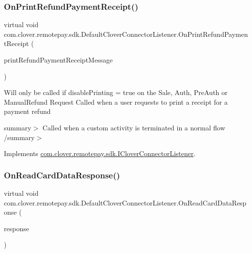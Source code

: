 \subsubsection{\texorpdfstring{On\+Print\+Refund\+Payment\+Receipt()}{OnPrintRefundPaymentReceipt()}}
{\footnotesize\ttfamily virtual void com.\+clover.\+remotepay.\+sdk.\+Default\+Clover\+Connector\+Listener.\+On\+Print\+Refund\+Payment\+Receipt (\begin{DoxyParamCaption}\item[{\hyperlink{classcom_1_1clover_1_1remotepay_1_1sdk_1_1_print_refund_payment_receipt_message}{Print\+Refund\+Payment\+Receipt\+Message}}]{print\+Refund\+Payment\+Receipt\+Message }\end{DoxyParamCaption})\hspace{0.3cm}{\ttfamily [virtual]}}



Will only be called if disable\+Printing = true on the Sale, Auth, Pre\+Auth or Manual\+Refund Request Called when a user requests to print a receipt for a payment refund 

summary$>$ Called when a custom activity is terminated in a normal flow /summary$>$ 

Implements \hyperlink{interfacecom_1_1clover_1_1remotepay_1_1sdk_1_1_i_clover_connector_listener_a728073276539065bc64d4eea1009394d}{com.\+clover.\+remotepay.\+sdk.\+I\+Clover\+Connector\+Listener}.

\mbox{\label{classcom_1_1clover_1_1remotepay_1_1sdk_1_1_default_clover_connector_listener_abf40aa043a50f59be9e36c3911ac895d}} 
\subsubsection{\texorpdfstring{On\+Read\+Card\+Data\+Response()}{OnReadCardDataResponse()}}
{\footnotesize\ttfamily virtual void com.\+clover.\+remotepay.\+sdk.\+Default\+Clover\+Connector\+Listener.\+On\+Read\+Card\+Data\+Response (\begin{DoxyParamCaption}\item[{\hyperlink{classcom_1_1clover_1_1remotepay_1_1sdk_1_1_read_card_data_response}{Read\+Card\+Data\+Response}}]{response }\end{DoxyParamCaption})\hspace{0.3cm}{\ttfamily [virtual]}}



